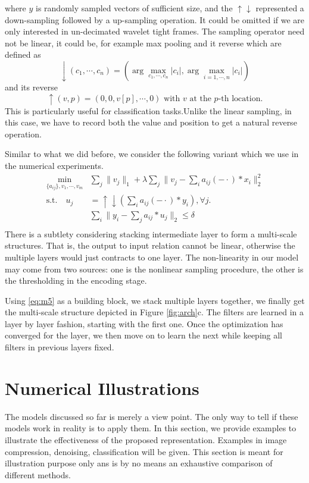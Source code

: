 \documentclass[a4paper]{article}
\begin{document}
where $y$ is randomly sampled vectors of sufficient size, and the $\uparrow \downarrow$ represented a down-sampling followed by a up-sampling operation. It could be omitted if we are only interested in un-decimated wavelet tight frames. The sampling operator need not be linear, it could be, for example max pooling and it reverse which are defined as 
\[
\downarrow(c_1,\cdots,c_n) = (\arg\max_{c_1,\cdots,c_n} |c_i|, \arg\max_{i=1,\cdots,n} |c_i|)
\]
and its reverse
\[
\uparrow(v,p)=(0,0,v[p],\cdots,0) \textrm{ with $v$ at the $p$-th location}.
\]
This is particularly useful for classification tasks.Unlike the linear sampling, in this case, we have to record both the value and position to get a natural reverse operation.

Similar to what we did before, we consider the following variant which we use in the numerical experiments.
\begin{equation}
\label{eq:m5}
\begin{aligned}
\min_{\{a_{ij}\}, v_1,\cdots,v_m}& \sum_j \|v_j\|_1 + \lambda \sum_j \|v_j-  \sum_{i} a_{ij}(-\cdot)*x_i \|_2^2\\
 \textrm{s.t.}  	\quad 	u_j&=\uparrow\downarrow(\sum_i a_{ij}(-\cdot)*y_i), \forall j.\\
&\sum_i \|y_i - \sum_j a_{ij}*u_j\|_2  \leq \delta\\
\end{aligned}
\end{equation}
There is a subtlety considering stacking intermediate layer to form a multi-scale structures. That is, the output to input relation cannot be linear, otherwise the multiple layers would just contracts to one layer. The non-linearity in our model may come from two sources: one is the nonlinear sampling procedure, the other is the thresholding in the encoding stage.

Using \eqref{eq:m5} as a building block, we stack multiple layers together, we finally get the multi-scale structure depicted in Figure \ref{fig:arch}c. The filters are learned in a  layer by layer fashion, starting with the first one. Once the optimization has converged for the layer, we then move on to learn the next while keeping all filters in previous layers fixed. 

\section{Numerical Illustrations}
The models discussed so far is merely a view point. The only way to tell if these models work in reality is to apply them. In this section, we provide examples to illustrate the effectiveness of the proposed representation. Examples in image compression, denoising, classification will be given. This section is meant for illustration purpose only ans is by no means an exhaustive comparison of different methods.
\end{document}
